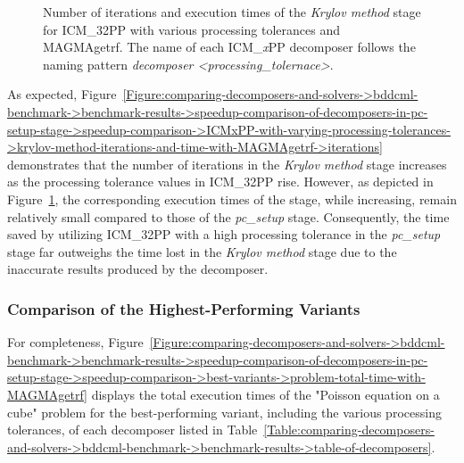 \begin{figure}[ht!]
\begin{subfigure}{\textwidth}
		\label{Figure:comparing-decomposers-and-solvers->bddcml-benchmark->benchmark-results->speedup-comparison-of-decomposers-in-pc-setup-stage->speedup-comparison->ICMxPP-with-varying-processing-tolerances->krylov-method-iterations-and-time-with-MAGMAgetrf->time}
	\end{subfigure}
	\caption{Number of iterations and execution times of the \textit{Krylov method} stage for ICM\_32PP with various processing tolerances and MAGMAgetrf.
		The name of each ICM\_\textit{x}PP decomposer follows the naming pattern \textit{decomposer <processing\_tolernace>}.
	}
	\label{Figure:comparing-decomposers-and-solvers->bddcml-benchmark->benchmark-results->speedup-comparison-of-decomposers-in-pc-setup-stage->speedup-comparison->ICMxPP-with-varying-processing-tolerances->krylov-method-iterations-and-time-with-MAGMAgetrf}
\end{figure}

As expected, Figure~\ref{Figure:comparing-decomposers-and-solvers->bddcml-benchmark->benchmark-results->speedup-comparison-of-decomposers-in-pc-setup-stage->speedup-comparison->ICMxPP-with-varying-processing-tolerances->krylov-method-iterations-and-time-with-MAGMAgetrf->iterations} demonstrates that the number of iterations in the \textit{Krylov method} stage increases as the processing tolerance values in ICM\_32PP rise.
However, as depicted in Figure~\ref{Figure:comparing-decomposers-and-solvers->bddcml-benchmark->benchmark-results->speedup-comparison-of-decomposers-in-pc-setup-stage->speedup-comparison->ICMxPP-with-varying-processing-tolerances->krylov-method-iterations-and-time-with-MAGMAgetrf->time}, the corresponding execution times of the stage, while increasing, remain relatively small compared to those of the \textit{pc\_setup} stage.
Consequently, the time saved by utilizing ICM\_32PP with a high processing tolerance in the \textit{pc\_setup} stage far outweighs the time lost in the \textit{Krylov method} stage due to the inaccurate results produced by the decomposer.

\subsubsection{Comparison of the Highest-Performing Variants} For completeness, Figure~\ref{Figure:comparing-decomposers-and-solvers->bddcml-benchmark->benchmark-results->speedup-comparison-of-decomposers-in-pc-setup-stage->speedup-comparison->best-variants->problem-total-time-with-MAGMAgetrf} displays the total execution times of the "Poisson equation on a cube" problem for the best-performing variant, including the various processing tolerances, of each decomposer listed in Table~\ref{Table:comparing-decomposers-and-solvers->bddcml-benchmark->benchmark-results->table-of-decomposers}.

